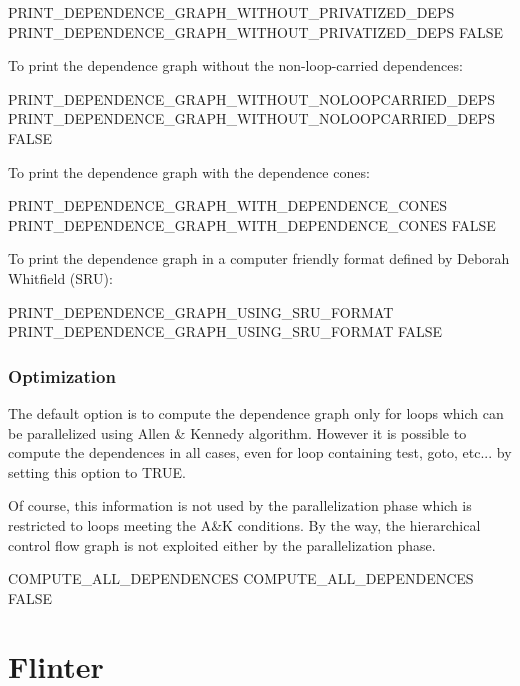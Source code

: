 \documentclass[a4paper]{report}
\begin{document}
\begin{PipsProp}{PRINT_DEPENDENCE_GRAPH_WITHOUT_PRIVATIZED_DEPS}
PRINT_DEPENDENCE_GRAPH_WITHOUT_PRIVATIZED_DEPS FALSE
\end{PipsProp}

To print the dependence graph without the non-loop-carried dependences:

\begin{PipsProp}{PRINT_DEPENDENCE_GRAPH_WITHOUT_NOLOOPCARRIED_DEPS}
PRINT_DEPENDENCE_GRAPH_WITHOUT_NOLOOPCARRIED_DEPS FALSE
\end{PipsProp}

To print the dependence graph with the dependence cones:

\begin{PipsProp}{PRINT_DEPENDENCE_GRAPH_WITH_DEPENDENCE_CONES}
PRINT_DEPENDENCE_GRAPH_WITH_DEPENDENCE_CONES FALSE
\end{PipsProp}

To print the dependence graph in a computer friendly format defined by
Deborah Whitfield (SRU):

\begin{PipsProp}{PRINT_DEPENDENCE_GRAPH_USING_SRU_FORMAT}
PRINT_DEPENDENCE_GRAPH_USING_SRU_FORMAT FALSE
\end{PipsProp}

\subsubsection{Optimization}

The default option is to compute the dependence graph only for loops
which can be parallelized using Allen \& Kennedy algorithm.  However it
is possible to compute the dependences in all cases, even for loop
containing test, goto, etc...  by setting this option to TRUE.

Of course, this information is not used by the parallelization phase
which is restricted to loops meeting the A\&K conditions. By the way,
the hierarchical control flow graph is not exploited either by the
parallelization phase.

\begin{PipsProp}{COMPUTE_ALL_DEPENDENCES}
COMPUTE_ALL_DEPENDENCES FALSE
\end{PipsProp}


\section{Flinter}
\label{subsection-flinter}
\end{document}
